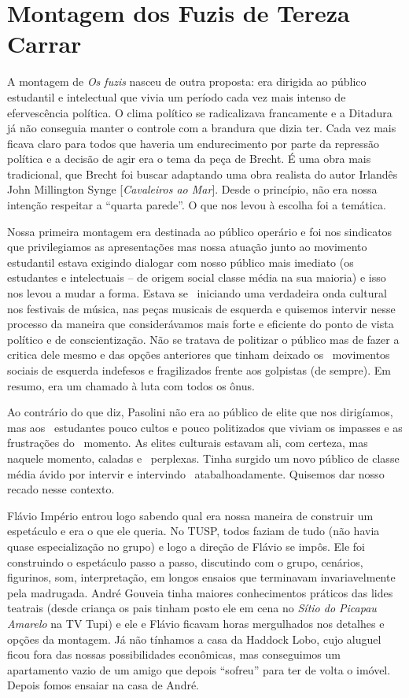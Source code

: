 \section{Montagem dos Fuzis de Tereza Carrar}

A montagem de \textit{Os fuzis} nasceu de outra proposta: era dirigida ao
público estudantil e intelectual que vivia um período cada vez mais
intenso de efervescência política. O clima político se radicalizava
francamente e a Ditadura já não conseguia manter o controle com a
brandura que dizia ter. Cada vez mais ficava claro para todos que
haveria um endurecimento por parte da repressão política e a decisão de
agir era o tema da peça de Brecht. É uma obra mais tradicional, que
Brecht foi buscar adaptando uma obra realista do autor Irlandês John
Millington Synge {[}\textit{Cavaleiros ao Mar}{]}. Desde o princípio, não
era nossa intenção respeitar a “quarta parede”. O que nos levou à
escolha foi a temática.

Nossa primeira montagem era destinada ao público operário e foi nos
sindicatos que privilegiamos as apresentações mas nossa atuação junto ao
movimento estudantil estava exigindo dialogar com nosso público mais
imediato (os estudantes e intelectuais -- de origem social classe média
na sua maioria) e isso nos levou a mudar a forma. Estava se ~iniciando
uma verdadeira onda cultural nos festivais de música, nas peças musicais
de esquerda e quisemos intervir nesse processo da maneira que
considerávamos mais forte e eficiente do ponto de vista político e de
conscientização. Não se tratava de politizar o público mas de fazer a
critica dele mesmo e das opções anteriores que tinham deixado os
~movimentos sociais de esquerda indefesos e fragilizados frente aos
golpistas (de sempre). Em resumo, era um chamado à luta com todos os
ônus.

Ao contrário do que diz, Pasolini não era ao público de elite que nos
dirigíamos, mas aos~ estudantes pouco cultos e pouco politizados que
viviam os impasses e as frustrações do~ momento. As elites culturais
estavam ali, com certeza, mas naquele momento, caladas e~ perplexas.
Tinha surgido um novo público de classe média ávido por intervir e
intervindo~ atabalhoadamente. Quisemos dar nosso recado nesse contexto.

Flávio Império entrou logo sabendo qual era nossa maneira de construir
um espetáculo e era o que ele queria. No TUSP, todos faziam de tudo (não
havia quase especialização no grupo) e logo a direção de Flávio se
impôs. Ele foi construindo o espetáculo passo a passo, discutindo com o
grupo, cenários, figurinos, som, interpretação, em longos ensaios que
terminavam invariavelmente pela madrugada. André Gouveia tinha maiores
conhecimentos práticos das lides teatrais (desde criança os pais tinham
posto ele em cena no \textit{Sítio do Picapau Amarelo} na TV Tupi) e ele e
Flávio ficavam horas mergulhados nos detalhes e opções da montagem. Já
não tínhamos a casa da Haddock Lobo, cujo aluguel ficou fora das nossas
possibilidades econômicas, mas conseguimos um apartamento vazio de um
amigo que depois “sofreu” para ter de volta o imóvel. Depois fomos
ensaiar na casa de André.

